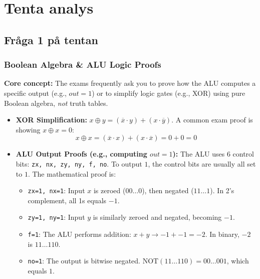\documentclass[12pt,a4paper]{article}
\begin{document}
\newpage
\section*{Tenta analys}
\subsection*{Fråga 1 på tentan}
\subsubsection*{Boolean Algebra \& ALU Logic Proofs}
\textbf{Core concept:} The exams frequently ask you to prove how the ALU computes a specific output (e.g., $out = 1$) or to simplify logic gates (e.g., XOR) using pure Boolean algebra, \textit{not} truth tables.
\begin{itemize}
    \item \textbf{XOR Simplification:} 
    $x \oplus y = (\overline{x} \cdot y) + (x \cdot \overline{y})$. 
    A common exam proof is showing $x \oplus x = 0$:
    $$x \oplus x = (\overline{x} \cdot x) + (x \cdot \overline{x}) = 0 + 0 = 0$$
    \item \textbf{ALU Output Proofs (e.g., computing $out = 1$):}
    The ALU uses 6 control bits: \texttt{zx, nx, zy, ny, f, no}. To output $1$, the control bits are usually all set to $1$. The mathematical proof is:
    \begin{itemize}
        \item \texttt{zx=1, nx=1}: Input $x$ is zeroed ($00\dots0$), then negated ($11\dots1$). In 2's complement, all 1s equals $-1$.
        \item \texttt{zy=1, ny=1}: Input $y$ is similarly zeroed and negated, becoming $-1$.
        \item \texttt{f=1}: The ALU performs addition: $x + y \rightarrow -1 + -1 = -2$. In binary, $-2$ is $11\dots110$.
        \item \texttt{no=1}: The output is bitwise negated. $\text{NOT}(11\dots110) = 00\dots001$, which equals $1$.
    \end{itemize}
\end{itemize}
\end{document}
